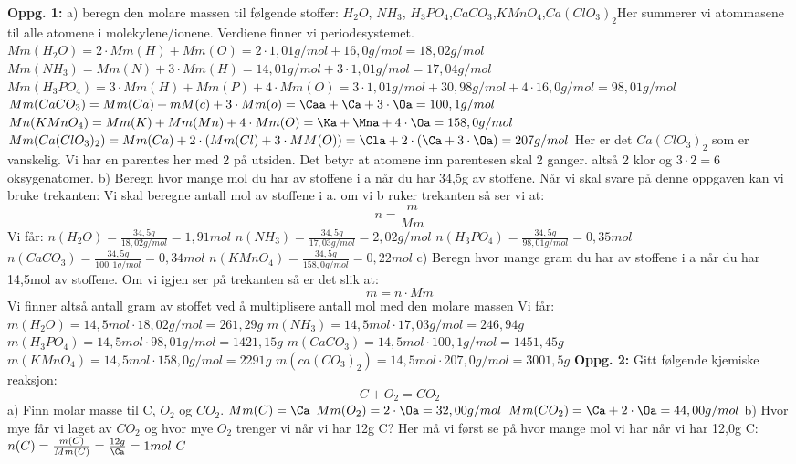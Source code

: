 \documentclass[12pt,a4paper]{article}
\begin{document}
\begin{center}
\end{center}\vspace{1cm}
\textbf{Oppg. 1:}\nl
a) beregn den molare massen til følgende stoffer:\nl
$H_2O$, $NH_3$, $H_3PO_4$,$CaCO_3$,$KMnO_4$,$Ca(ClO_3)_2$\nl[2]
Her summerer vi atommasene til alle atomene i molekylene/ionene. Verdiene finner vi periodesystemet.\nl
$Mm(H_2O)=2\cdot Mm(H)+Mm(O)=2\cdot 1,01g/mol+16,0g/mol=18,02g/mol$\nl
$Mm(NH_3)=Mm(N)+3\cdot Mm(H)=14,01g/mol+3\cdot 1,01g/mol=17,04g/mol$\nl
$Mm(H_3PO_4)=3\cdot Mm(H)+Mm(P)+4\cdot Mm(O)=3\cdot 1,01g/mol+30,98g/mol+4\cdot 16,0g/mol=98,01g/mol$\nl
$Mm(CaCO_3)=Mm(Ca)+mM(c)+3\cdot Mm(o)=\Caa+\Ca+3\cdot \Oa=100,1g/mol$\nl
$Mn(KMnO_4)=Mm(K)+Mm(Mn)+4\cdot Mm(O)=\Ka+\Mna+4\cdot \Oa=158,0g/mol$\nl
$Mm(Ca(ClO_3)_2)=Mm(Ca)+2\cdot (Mm(Cl)+3\cdot MM(O))=\Cla+2\cdot(\Ca+3\cdot\Oa)=207g/mol$\nl
Her er det $Ca(ClO_3)_2$ som er vanskelig.  Vi har en parentes her med 2 på utsiden.  Det betyr at atomene inn parentesen skal 2 ganger. altså 2 klor og $3\cdot 2=6$ oksygenatomer. 
\newpage
b) Beregn hvor mange mol du har av stoffene i a når du har 34,5g av stoffene.\nl
Når vi skal svare på denne oppgaven kan vi bruke trekanten:\nl
\trekant\nl[2]
Vi skal beregne antall mol av stoffene i a. om vi b ruker trekanten så ser vi at:\nl
$$n=\frac{m}{Mm}$$\nl
Vi får:\nl
$n(H_2O)=\frac{34,5g}{18,02g/mol}=1,91mol$\nl
$n(NH_3)=\frac{34,5g}{17,03g/mol}=2,02g/mol$\nl
$n(H_3PO_4)=\frac{34,5g}{98,01g/mol}=0,35mol$\nl
$n(CaCO_3)=\frac{34,5g}{100,1g/mol}=0,34mol$\nl
$n(KMnO_4)=\frac{34,5g}{158,0g/mol}=0,22mol$\nl
\newpage
c) Beregn hvor mange gram du har av stoffene i a når du har 14,5mol av stoffene.\nl
Om vi igjen ser på  trekanten så er det slik at:
$$m=n\cdot Mm$$\nl
Vi finner altså antall gram av stoffet ved å multiplisere antall mol med den molare massen\nl
Vi får:
$m(H_2O)=14,5mol\cdot 18,02g/mol=261,29g$\nl
$m(NH_3)=14,5mol\cdot 17,03g/mol=246,94g$\nl
$m(H_3PO_4)=14,5mol\cdot 98,01g/mol=1421,15g$\nl
$m(CaCO_3)=14,5mol\cdot 100,1g/mol=1451,45g$\nl
$m(KMnO_4)=14,5mol\cdot 158,0g/mol=2291g$\nl
$m(ca(CO_3)_2)=14,5mol\cdot 207,0g/mol=3001,5g$\nl
\nl[2]
\textbf{Oppg. 2:}\nl
Gitt følgende kjemiske reaksjon:\nl
$$C+O_2=CO_2$$\nl
a) Finn molar masse til C, $O_2$ og $CO_2$.\nl
$Mm(C)=\Ca$\nl
$Mm(O_2)=2\cdot\Oa=32,00g/mol$\nl
$Mm(CO_2)=\Ca+2\cdot \Oa=44,00g/mol$
\newpage
b) Hvor mye får vi laget av $CO_2$ og hvor mye $O_2$ trenger vi når vi har 12g C?\nl
Her må vi først se på hvor mange mol vi har når vi har 12,0g C:\nl
$n(C)=\frac{m(C)}{Mm(C)}=\frac{12g}{\Ca}=1mol \ C$\nl
\end{document}
